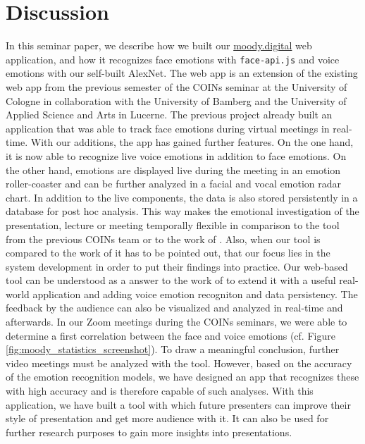\section{Discussion}
\label{sec:Discussion}
In this seminar paper, we describe how we built our \url{moody.digital} web application, and how it recognizes face emotions with \texttt{face-api.js} and voice emotions with our self-built AlexNet. The web app is an extension of the existing web app from the previous semester of the COINs seminar at the University of Cologne in collaboration with the University of Bamberg and the University of Applied Science and Arts in Lucerne. The previous project already built an application that was able to track face emotions during virtual meetings in real-time. With our additions, the app has gained further features. On the one hand, it is now able to recognize live voice emotions in addition to face emotions. On the other hand, emotions are displayed live during the meeting in an emotion roller-coaster and can be further analyzed in a facial and vocal emotion radar chart. In addition to the live components, the data is also stored persistently in a database for post hoc analysis. This way makes the emotional investigation of the presentation, lecture or meeting temporally flexible in comparison to the tool from the previous COINs team or to the work of \citeauthor{rosler_reducing_2021}. Also, when our tool is compared to the work of \citeauthor{rosler_reducing_2021} it has to be pointed out, that our focus lies in the system development in order to put their findings into practice. Our web-based tool can be understood as a answer to the work of \citeauthor{rosler_reducing_2021} to extend it with a useful real-world application and adding voice emotion recogniton and data persistency. The feedback by the audience can also be visualized and analyzed in real-time and afterwards. In our Zoom meetings during the COINs seminars, we were able to determine a first correlation between the face and voice emotions (cf. Figure \ref{fig:moody_statistics_screenshot}). To draw a meaningful conclusion, further video meetings must be analyzed with the tool. However, based on the accuracy of the emotion recognition models, we have designed an app that recognizes these with high accuracy and is therefore capable of such analyses. 
With this application, we have built a tool with which future presenters can improve their style of presentation and get more audience with it. It can also be used for further research purposes to gain more insights into presentations.
